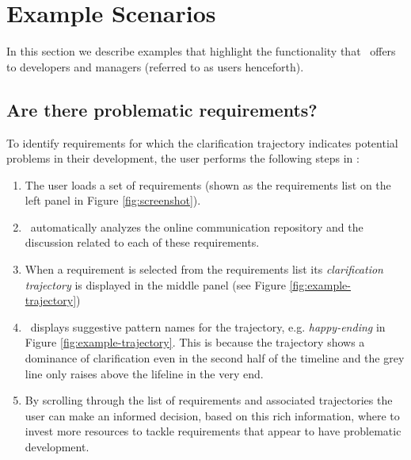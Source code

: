 \section{Example Scenarios}
In this section we describe examples that highlight the functionality that \viss\ offers to developers and managers (referred to as users henceforth).

\subsection{Are there problematic requirements?}
To identify requirements for which the clarification trajectory indicates potential problems in their development, the user performs the following steps in \viss:

\begin{enumerate}
\item The user loads a set of requirements (shown as the requirements list on the left panel in Figure \ref{fig:screenshot}).
\item \viss\ automatically analyzes the online communication repository and the discussion related to each of these requirements.  
\item When a requirement is selected from the requirements list its \emph{clarification trajectory} is displayed in the middle panel (see Figure \ref{fig:example-trajectory})
\item \viss\ displays suggestive pattern names for the trajectory, e.g. \emph{happy-ending} in Figure \ref{fig:example-trajectory}. This is because the trajectory shows a dominance of clarification even in the second half of the timeline and the grey line only raises above the lifeline in the very end.
\item By scrolling through the list of requirements and associated trajectories the user can make an informed decision, based on this rich information, where to invest more resources to tackle requirements that appear to have problematic development.
\end{enumerate}


